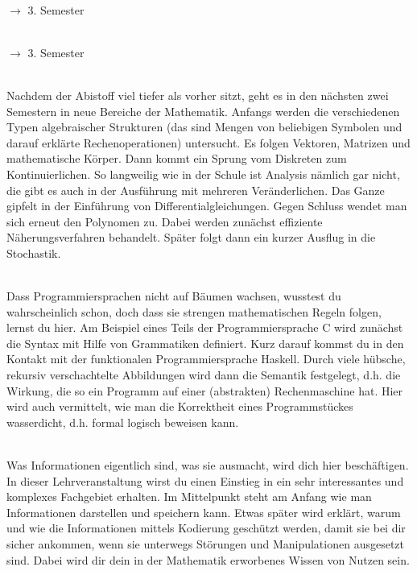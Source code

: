 \textbf{} \\
$\rightarrow$ 3. Semester

\textbf{} \\
$\rightarrow$ 3. Semester



\textbf{} \\
Nachdem der Abistoff viel tiefer als vorher sitzt, geht es in den nächsten zwei Semestern in neue Bereiche der Mathematik.
Anfangs werden die verschiedenen Typen algebraischer Strukturen (das sind Mengen von beliebigen Symbolen und darauf erklärte Rechenoperationen) untersucht.
Es folgen Vektoren, Matrizen und mathematische Körper.
Dann kommt ein Sprung vom Diskreten zum Kontinuierlichen.
So langweilig wie in der Schule ist Analysis nämlich gar nicht, die gibt es auch in der Ausführung mit mehreren Veränderlichen.
Das Ganze gipfelt in der Einführung von Differentialgleichungen.
Gegen Schluss wendet man sich erneut den Polynomen zu.
Dabei werden zunächst effiziente Näherungsverfahren behandelt.
Später folgt dann ein kurzer Ausflug in die Stochastik.

\textbf{} \\
Dass Programmiersprachen nicht auf Bäumen wachsen, wusstest du wahrscheinlich schon, doch dass sie strengen mathematischen Regeln folgen, lernst du hier.
Am Beispiel eines Teils der Programmiersprache C wird zunächst die Syntax mit Hilfe von Grammatiken definiert.
Kurz darauf kommst du in den Kontakt mit der funktionalen Programmiersprache Haskell.
Durch viele hübsche, rekursiv verschachtelte Abbildungen wird dann die Semantik festgelegt, d.h. die Wirkung, die so ein Programm auf einer (abstrakten) Rechenmaschine hat.
Hier wird auch vermittelt, wie man die Korrektheit eines Programmstückes \glqq wasserdicht\grqq, d.h. formal logisch beweisen kann.

\textbf{} \\
Was Informationen eigentlich sind, was sie ausmacht, wird dich hier beschäftigen.
In dieser Lehrveranstaltung wirst du einen Einstieg in ein sehr interessantes und komplexes Fachgebiet erhalten.
Im Mittelpunkt steht am Anfang wie man Informationen darstellen und speichern kann.
Etwas später wird erklärt, warum und wie die Informationen mittels Kodierung geschützt werden, damit sie bei dir sicher ankommen, wenn sie unterwegs Störungen und Manipulationen ausgesetzt sind.
Dabei wird dir dein in der Mathematik erworbenes Wissen von Nutzen sein.

